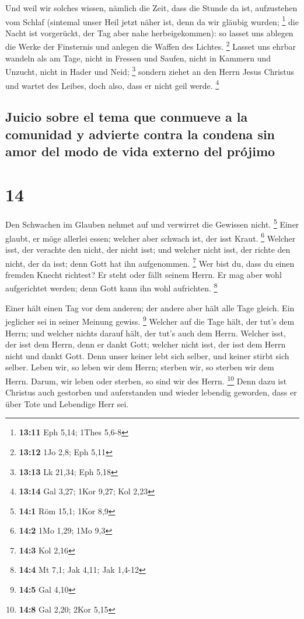  Und weil wir solches wissen, nämlich die Zeit, dass die
Stunde da ist, aufzustehen vom Schlaf (sintemal unser Heil jetzt näher
ist, denn da wir gläubig wurden; \footnote{\textbf{13:11} Eph 5,14;
  1Thes 5,6-8}  die Nacht ist vorgerückt, der Tag aber
nahe herbeigekommen): so lasset uns ablegen die Werke der Finsternis und
anlegen die Waffen des Lichtes. \footnote{\textbf{13:12} 1Jo 2,8; Eph
  5,11}  Lasset uns ehrbar wandeln als am Tage, nicht in
Fressen und Saufen, nicht in Kammern und Unzucht, nicht in Hader und
Neid; \footnote{\textbf{13:13} Lk 21,34; Eph 5,18} 
sondern ziehet an den Herrn Jesus Christus und wartet des Leibes, doch
also, dass er nicht geil werde. \footnote{\textbf{13:14} Gal 3,27; 1Kor
  9,27; Kol 2,23}

\hypertarget{juicio-sobre-el-tema-que-conmueve-a-la-comunidad-y-advierte-contra-la-condena-sin-amor-del-modo-de-vida-externo-del-pruxf3jimo}{%
\subsection{Juicio sobre el tema que conmueve a la comunidad y advierte
contra la condena sin amor del modo de vida externo del
prójimo}\label{juicio-sobre-el-tema-que-conmueve-a-la-comunidad-y-advierte-contra-la-condena-sin-amor-del-modo-de-vida-externo-del-pruxf3jimo}}

\hypertarget{section-13}{%
\section{14}\label{section-13}}

 Den Schwachen im Glauben nehmet auf und verwirret die
Gewissen nicht. \footnote{\textbf{14:1} Röm 15,1; 1Kor 8,9}
 Einer glaubt, er möge allerlei essen; welcher aber
schwach ist, der isst Kraut. \footnote{\textbf{14:2} 1Mo 1,29; 1Mo 9,3}
 Welcher isst, der verachte den nicht, der nicht isst; und
welcher nicht isst, der richte den nicht, der da isst; denn Gott hat ihn
aufgenommen. \footnote{\textbf{14:3} Kol 2,16}  Wer bist
du, dass du einen fremden Knecht richtest? Er steht oder fällt seinem
Herrn. Er mag aber wohl aufgerichtet werden; denn Gott kann ihn wohl
aufrichten. \footnote{\textbf{14:4} Mt 7,1; Jak 4,11; Jak 1,4-12}

 Einer hält einen Tag vor dem anderen; der andere aber
hält alle Tage gleich. Ein jeglicher sei in seiner Meinung gewiss.
\footnote{\textbf{14:5} Gal 4,10}  Welcher auf die Tage
hält, der tut's dem Herrn; und welcher nichts darauf hält, der tut's
auch dem Herrn. Welcher isst, der isst dem Herrn, denn er dankt Gott;
welcher nicht isst, der isst dem Herrn nicht und dankt Gott.
 Denn unser keiner lebt sich selber, und keiner stirbt
sich selber.  Leben wir, so leben wir dem Herrn; sterben
wir, so sterben wir dem Herrn. Darum, wir leben oder sterben, so sind
wir des Herrn. \footnote{\textbf{14:8} Gal 2,20; 2Kor 5,15}
 Denn dazu ist Christus auch gestorben und auferstanden
und wieder lebendig geworden, dass er über Tote und Lebendige Herr sei.

